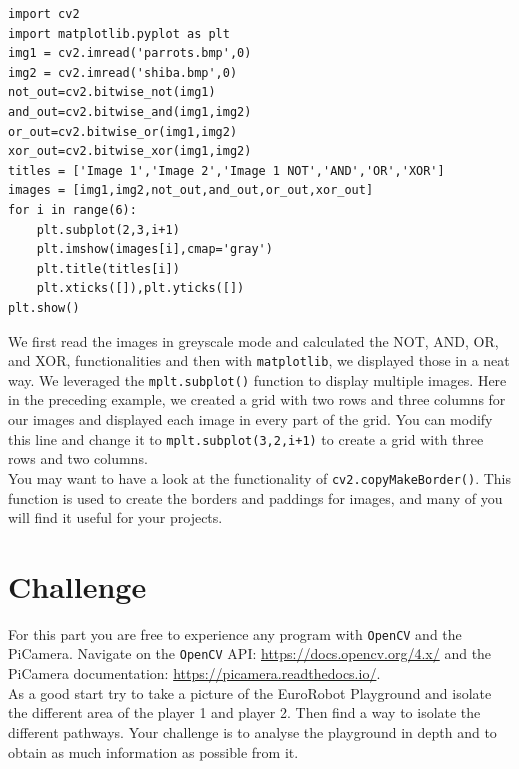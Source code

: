 \documentclass{labo}
\newcommand{\opencv}{\texttt{OpenCV} }
\begin{document}
\begin{verbatim}
import cv2
import matplotlib.pyplot as plt
img1 = cv2.imread('parrots.bmp',0)
img2 = cv2.imread('shiba.bmp',0)
not_out=cv2.bitwise_not(img1)
and_out=cv2.bitwise_and(img1,img2)
or_out=cv2.bitwise_or(img1,img2)
xor_out=cv2.bitwise_xor(img1,img2)
titles = ['Image 1','Image 2','Image 1 NOT','AND','OR','XOR']
images = [img1,img2,not_out,and_out,or_out,xor_out]
for i in range(6):
	plt.subplot(2,3,i+1)
	plt.imshow(images[i],cmap='gray')
	plt.title(titles[i])
	plt.xticks([]),plt.yticks([])
plt.show()
\end{verbatim}

We first read the images in greyscale mode and calculated the NOT, AND, OR, and XOR, functionalities and then with \texttt{matplotlib}, we displayed those in a neat way. We leveraged the \texttt{mplt.subplot()} function to display multiple images. Here in the preceding example, we created a grid with two rows and three columns for our images and displayed each image in every part of the grid. You can modify this line and change it to \texttt{mplt.subplot(3,2,i+1)} to create a grid with three rows and two columns.\\

You may want to have a look at the functionality of \texttt{cv2.copyMakeBorder()}. This function is used to create the borders and paddings for images, and many of you will find it useful for your projects.




\section*{Challenge}
For this part you are free to experience any program with \opencv and the PiCamera.
Navigate on the \opencv API: \url{https://docs.opencv.org/4.x/} and the PiCamera documentation: \url{https://picamera.readthedocs.io/}.\\

As a good start try to take a picture of the EuroRobot Playground and isolate the different area of the player 1 and player 2. Then find a way to isolate the different pathways.
Your challenge is to analyse the playground in depth and to obtain as much information as possible from it.



\end{document}
